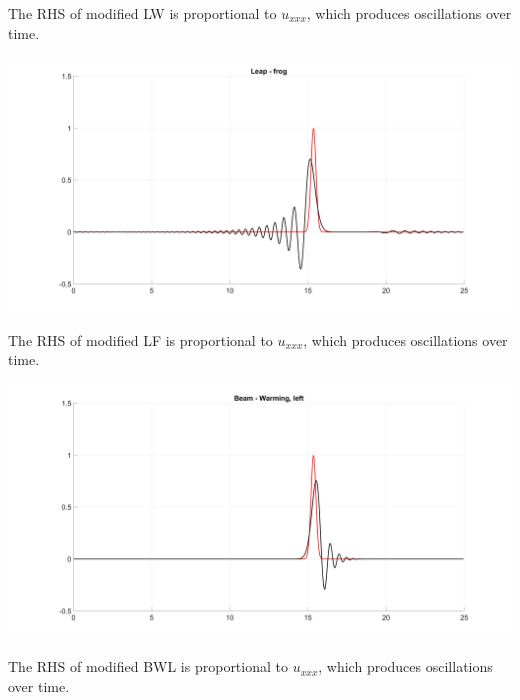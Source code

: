 \documentclass{article}
\begin{document}
\begin{enumerate}
\begin{enumerate}
\begin{enumerate}
		The RHS of modified LW is proportional to $u_{xxx}$, which produces oscillations over time.
		\begin{center}
			\includegraphics[scale=.18]{hw11 LF}
		\end{center}
		The RHS of modified LF is proportional to $u_{xxx}$, which produces oscillations over time.
		\begin{center}
			\includegraphics[scale=.18]{hw11 BWL}
		\end{center}
		The RHS of modified BWL is proportional to $u_{xxx}$, which produces oscillations over time.
	\end{enumerate}
	
\end{enumerate}


\end{enumerate}


	
\end{document}
